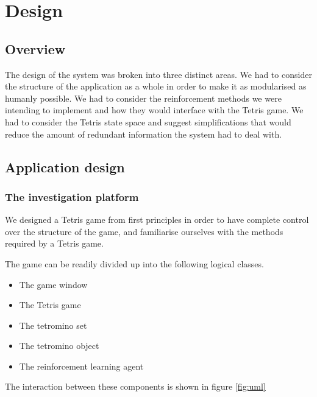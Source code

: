 \documentclass{rucsthesis}
\begin{document}
\chapter{Design}

\section{Overview}

The design of the system was broken into three distinct areas. We had to consider the structure of the application as a whole in order to make it as modularised as humanly possible. We had to consider the reinforcement methods we were intending to implement and how they would interface with the Tetris game. We had to consider the Tetris state space and suggest simplifications that would reduce the amount of redundant information the system had to deal with. 

\section{Application design}

\subsection{The investigation platform}

We designed a Tetris game from first principles in order to have complete control over the structure of the game, and familiarise ourselves with the methods required by a Tetris game.

The game can be readily divided up into the following logical classes.

\begin{itemize}
\item{The game window}
\item{The Tetris game}
\item{The tetromino set}
\item{The tetromino object}
\item{The reinforcement learning agent}
\end{itemize}

The interaction between these components is shown in figure \ref{fig:uml}
\end{document}
